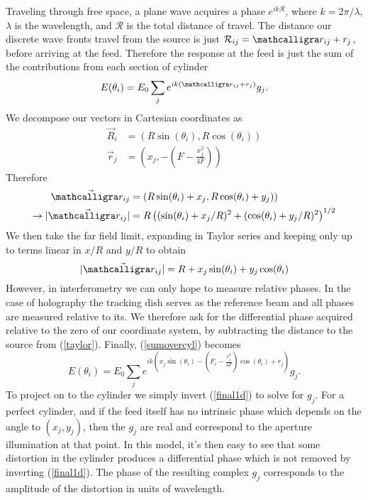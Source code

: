 Traveling through free space, a plane wave acquires a phase $e^{ik\mathcal{R}}$, where $k = 2\pi/\lambda$, $\lambda$ is the wavelength, and $\mathcal{R}$ is the total distance of travel. The distance our discrete wave fronts travel from the source is just $\mathcal{R}_{ij} = \scripty{r}_{ij}  + r_j$, before arriving at the feed. Therefore the response at the feed is just the sum of the contributions from each section of cylinder
\begin{equation}
E(\theta_i) = E_0 \sum_j e^{ik(\scripty{r}_{ij}  + r_j)} g_j.
\label{sumovercyl}
\end{equation}
We decompose our vectors in Cartesian coordinates as
\begin{align}
\vec{R}_i &= \left(R \sin(\theta_i), R \cos(\theta_i)\right) \\
\vec{r}_j &= \left(x_j, -(F-\frac{x_j^2}{4F})\right) 
\end{align}
Therefore
\begin{align}
\vec{\scripty{r}_{ij}} &= \left(R\sin(\theta_i) + x_j, R \cos(\theta_i) + y_j)\right) \\
\rightarrow |\vec{\scripty{r}_{ij}}| &= R \left( (\sin(\theta_i) + x_j/R)^2 + (\cos(\theta_i) + y_j/R )^2 \right)^{1/2}
\end{align}
We then take the far field limit, expanding in Taylor series and keeping only up to terms linear in $x/R$ and $y/R$ to obtain
\begin{equation}
|\vec{\scripty{r}_{ij}}| = R + x_j\sin(\theta_i) + y_j\cos(\theta_i) 
\label{taylor}
\end{equation}
However, in interferometry we can only hope to measure relative phases. In the case of holography the tracking dish serves as the reference beam and all phases are measured relative to its. We therefore ask for the differential phase acquired relative to the zero of our coordinate system, by subtracting the distance to the source from (\ref{taylor}). Finally, (\ref{sumovercyl}) becomes
\begin{equation}
E(\theta_i) = E_0 \sum_j e^{ik( x_j\sin(\theta_i) - (F_i - \frac{x_j^2}{4F})\cos(\theta_i)   + r_j)} g_j.
\label{final1d}
\end{equation}
To project on to the cylinder we simply invert (\ref{final1d}) to solve for $g_j$. For a perfect cylinder, and if the feed itself has no intrinsic phase which depends on the angle to $(x_j, y_j)$, then the $g_j$ are real and correspond to the aperture illumination at that point. In this model, it's then easy to see that some distortion in the cylinder produces a differential phase which is not removed by inverting (\ref{final1d}). The phase of the resulting complex $g_j$ corresponds to the amplitude of the distortion in units of wavelength.


